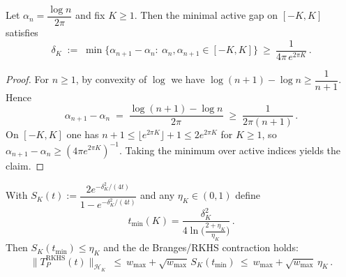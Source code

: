 \begin{lemma}\label{md:lem:gap-compact}
Let $\alpha_n=\dfrac{\log n}{2\pi}$ and fix $K\ge 1$. Then the minimal active gap on $[-K,K]$ satisfies
\begin{equation}\label{eq:MD_2_3_constants-formula-4}
\delta_K\;:=\;\min\{\alpha_{n+1}-\alpha_n:\ \alpha_n,\alpha_{n+1}\in[-K,K]\}\ \ge\ \frac{1}{4\pi\,e^{2\pi K}}\,.
\end{equation}
\end{lemma}
\begin{proof}
For $n\ge1$, by convexity of $\log$ we have $\log(n+1)-\log n \ge \dfrac{1}{n+1}$. Hence
\begin{equation}\label{eq:MD_2_3_constants-formula-3}
\alpha_{n+1}-\alpha_n\;=\;\frac{\log(n+1)-\log n}{2\pi}\;\ge\;\frac{1}{2\pi(n+1)}\,.
\end{equation}
On $[-K,K]$ one has $n+1\le \lfloor e^{2\pi K}\rfloor+1\le 2 e^{2\pi K}$ for $K\ge1$, so $\alpha_{n+1}-\alpha_n\ge (4\pi e^{2\pi K})^{-1}$. Taking the minimum over active indices yields the claim.
\end{proof}

\begin{proposition}\label{md:prop:rkhs-contraction}
With $S_K(t):=\dfrac{2e^{-\delta_K^2/(4t)}}{1-e^{-\delta_K^2/(4t)}}$ and any $\eta_K\in(0,1)$ define
\begin{equation}\label{eq:MD_2_3_constants-formula}
t_{\min}(K)=\frac{\delta_K^2}{4\ln\!\big(\tfrac{2+\eta_K}{\eta_K}\big)}\,.
\end{equation}
Then $S_K(t_{\min})\le \eta_K$ and the de Branges/RKHS contraction holds:
\begin{equation}\label{eq:MD_2_3_constants-formula-2}
\|T_P^{\mathrm{RKHS}}(t)\|_{\mathcal H_K}\ \le\ w_{\max}+\sqrt{w_{\max}}\,S_K(t_{\min})\ \le\ w_{\max}+\sqrt{w_{\max}}\,\eta_K\,.
\end{equation}
\end{proposition}

